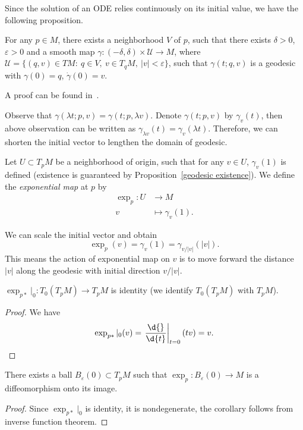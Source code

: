 Since the solution of an ODE relies continuously on its initial value, we have the following proposition.
\begin{prop}\label{geodesic existence}
    For any $p\in M$, there exists a neighborhood $V$ of $p$, such that there exists $\delta>0$, $\varepsilon>0$ and a smooth map $\gamma:(-\delta,\delta)\times\mathscr{U}\to M$, where $\mathscr{U}=\{(q,v)\in TM:\ q\in V,\ v\in T_qM,\ |v|<\varepsilon\}$, such that $\gamma(t;q,v)$ is a geodesic with $\gamma(0)=q$, $\dot\gamma(0)=v$.
\end{prop}
A proof can be found in~\cite[Chapter 3, Lemma 1]{Wu}.

Observe that $\gamma(\lambda t;p,v)=\gamma(t;p,\lambda v)$.
Denote $\gamma(t;p,v)$ by $\gamma_v(t)$, then above observation can be written as $\gamma_{\lambda v}(t)=\gamma_v(\lambda t)$.
Therefore, we can shorten the initial vector to lengthen the domain of geodesic.

\begin{defn}
    Let $U\subset T_pM$ be a neighborhood of origin, such that for any $v\in U$, $\gamma_v(1)$ is defined (existence is guaranteed by Proposition~\ref{geodesic existence}).
    We define the \emph{exponential map} at $p$ by
    \begin{align*}
        \exp_p:U&\to M\\
        v&\mapsto \gamma_v(1).
    \end{align*}
\end{defn}

\begin{rem}
    We can scale the initial vector and obtain
    \[\exp_p(v)=\gamma_v(1)=\gamma_{v/|v|}(|v|).\]
    This means the action of exponential map on $v$ is to move forward the distance $|v|$ along the geodesic with initial direction $v/|v|$.
\end{rem}

\begin{prop}\label{exp at 0}
    $\exp_{p*}|_0:T_0(T_pM)\to T_pM$ is identity (we identify $T_0(T_pM)$ with $T_pM$).
\end{prop}
\begin{proof}
    We have
    \[\exp_{p*}|_0(v)=\left.\frac{\d{}}{\d{t}}\right|_{t=0}(tv)=v.\qedhere\]
\end{proof}

\begin{cor}
    There exists a ball $B_\varepsilon(0)\subset T_pM$ such that $\exp_p:B_\varepsilon(0)\to M$ is a diffeomorphism onto its image.
\end{cor}
\begin{proof}
    Since $\exp_{p*}|_0$ is identity, it is nondegenerate, the corollary follows from inverse function theorem.
\end{proof}

